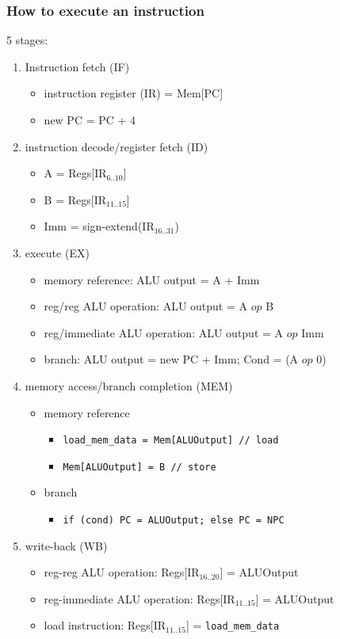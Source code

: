 \documentclass[12pt]{extarticle}
\begin{document}
	\subsubsection{How to execute an instruction}

	5 stages:

	\begin{enumerate}
		\item Instruction fetch (IF)
		\begin{itemize}
			\item instruction register (IR) = Mem[PC]
			\item new PC = PC + 4
		\end{itemize}

		\item instruction decode/register fetch (ID)
		\begin{itemize}
			\item A = Regs[IR$_{6..10}$]
			\item B = Regs[IR$_{11..15}$]
			\item Imm = sign-extend(IR$_{16..31}$)
		\end{itemize}

		\item execute (EX)
		\begin{itemize}
			\item memory reference: ALU output = A + Imm
			\item reg/reg ALU operation: ALU output = A $op$ B
			\item reg/immediate ALU operation: ALU output = A $op$ Imm
			\item branch: ALU output = new PC + Imm; Cond = (A $op$ 0)
		\end{itemize}

		\item memory access/branch completion (MEM)
		\begin{itemize}
			\item memory reference
			\begin{itemize}
				\item \texttt{load\_mem\_data = Mem[ALUOutput] // load}
				\item \texttt{Mem[ALUOutput] = B  // store}
			\end{itemize}

			\item branch
			\begin{itemize}
				\item \texttt{if (cond) PC = ALUOutput; else PC = NPC}
			\end{itemize}
		\end{itemize}

		\item write-back (WB)
		\begin{itemize}
			\item reg-reg ALU operation: Regs[IR$_{16..20}$] = ALUOutput
			\item reg-immediate ALU operation: Regs[IR$_{11..15}$] = ALUOutput
			\item load instruction: Regs[IR$_{11..15}$] = \texttt{load\_mem\_data}
		\end{itemize}
	\end{enumerate}
\end{document}
